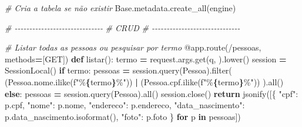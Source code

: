 \documentclass[
]{book}
\newenvironment{Shaded}{\begin{snugshade}}{\end{snugshade}}
\newcommand{\AttributeTok}[1]{\textcolor[rgb]{0.13,0.29,0.53}{#1}}
\newcommand{\BuiltInTok}[1]{#1}
\newcommand{\CommentTok}[1]{\textcolor[rgb]{0.56,0.35,0.01}{\textit{#1}}}
\newcommand{\ControlFlowTok}[1]{\textcolor[rgb]{0.13,0.29,0.53}{\textbf{#1}}}
\newcommand{\KeywordTok}[1]{\textcolor[rgb]{0.13,0.29,0.53}{\textbf{#1}}}
\newcommand{\NormalTok}[1]{#1}
\newcommand{\OperatorTok}[1]{\textcolor[rgb]{0.81,0.36,0.00}{\textbf{#1}}}
\newcommand{\SpecialCharTok}[1]{\textcolor[rgb]{0.81,0.36,0.00}{\textbf{#1}}}
\newcommand{\SpecialStringTok}[1]{\textcolor[rgb]{0.31,0.60,0.02}{#1}}
\newcommand{\StringTok}[1]{\textcolor[rgb]{0.31,0.60,0.02}{#1}}
\begin{document}
\begin{Shaded}
\begin{Highlighting}[]
\CommentTok{\# Cria a tabela se não existir}
\NormalTok{Base.metadata.create\_all(engine)}

\CommentTok{\# {-}{-}{-}{-}{-}{-}{-}{-}{-}{-}{-}{-}{-}{-}{-}{-}{-}{-}{-}{-}{-}{-}{-}{-}{-}{-}{-}{-}{-}{-}}
\CommentTok{\# CRUD}
\CommentTok{\# {-}{-}{-}{-}{-}{-}{-}{-}{-}{-}{-}{-}{-}{-}{-}{-}{-}{-}{-}{-}{-}{-}{-}{-}{-}{-}{-}{-}{-}{-}}

\CommentTok{\# Listar todas as pessoas ou pesquisar por termo}
\AttributeTok{@app.route}\NormalTok{(}\StringTok{\textquotesingle{}/pessoas\textquotesingle{}}\NormalTok{, methods}\OperatorTok{=}\NormalTok{[}\StringTok{\textquotesingle{}GET\textquotesingle{}}\NormalTok{])}
\KeywordTok{def}\NormalTok{ listar():}
\NormalTok{    termo }\OperatorTok{=}\NormalTok{ request.args.get(}\StringTok{\textquotesingle{}q\textquotesingle{}}\NormalTok{, }\StringTok{\textquotesingle{}\textquotesingle{}}\NormalTok{).lower()}
\NormalTok{    session }\OperatorTok{=}\NormalTok{ SessionLocal()}
    \ControlFlowTok{if}\NormalTok{ termo:}
\NormalTok{        pessoas }\OperatorTok{=}\NormalTok{ session.query(Pessoa).}\BuiltInTok{filter}\NormalTok{(}
\NormalTok{            (Pessoa.nome.ilike(}\SpecialStringTok{f"\%}\SpecialCharTok{\{}\NormalTok{termo}\SpecialCharTok{\}}\SpecialStringTok{\%"}\NormalTok{)) }\OperatorTok{|}\NormalTok{ (Pessoa.cpf.ilike(}\SpecialStringTok{f"\%}\SpecialCharTok{\{}\NormalTok{termo}\SpecialCharTok{\}}\SpecialStringTok{\%"}\NormalTok{))}
\NormalTok{        ).}\BuiltInTok{all}\NormalTok{()}
    \ControlFlowTok{else}\NormalTok{:}
\NormalTok{        pessoas }\OperatorTok{=}\NormalTok{ session.query(Pessoa).}\BuiltInTok{all}\NormalTok{()}
\NormalTok{    session.close()}
    \ControlFlowTok{return}\NormalTok{ jsonify([\{}
        \StringTok{"cpf"}\NormalTok{: p.cpf,}
        \StringTok{"nome"}\NormalTok{: p.nome,}
        \StringTok{"endereco"}\NormalTok{: p.endereco,}
        \StringTok{"data\_nascimento"}\NormalTok{: p.data\_nascimento.isoformat(),}
        \StringTok{"foto"}\NormalTok{: p.foto}
\NormalTok{    \} }\ControlFlowTok{for}\NormalTok{ p }\KeywordTok{in}\NormalTok{ pessoas])}


\end{Highlighting}
\end{Shaded}
\end{document}
